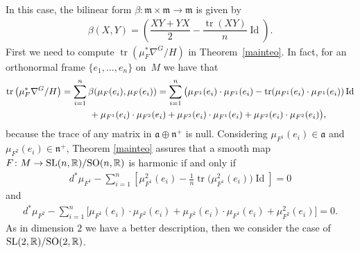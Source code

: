 \documentclass[pdftex]{sigma}
\numberwithin{equation}{section}
\newcommand{\m}{\mathfrak{m}}
\begin{document}
In this case, the bilinear form $\beta\colon \m \times \m \rightarrow \m$ is given by
\begin{gather}\label{fisherconnection}
  \beta(X,Y) = \left(\dfrac{XY+YX}{2} - \dfrac{\operatorname{tr}(XY)}{n}\operatorname{Id}\right).
\end{gather}
First we need to compute  $\operatorname{tr}(\mu_F^*\nabla^G/H)$ in Theorem~\ref{mainteo}. In fact, for an orthonormal frame $\{e_1,\ldots, e_n\}$ on~$M$  we have that
\begin{gather*}
  \operatorname{tr}\big(\mu_F^*\nabla^G/H\big)
    =   \sum_{i=1}^{n}\beta(\mu_F(e_i),\mu_F(e_i))
    =   \sum_{i=1}^{n}\big(\mu_{F^1}(e_i)\cdot \mu_{F^1}(e_i)  - {\rm tr}(\mu_{F^1}(e_i)\cdot \mu_{F^1}(e_i))\operatorname{Id}\\
  \hphantom{\operatorname{tr}\big(\mu_F^*\nabla^G/H\big)}{}
    +   \mu_{F^1}(e_i)\cdot\mu_{F^2}(e_i)+ \mu_{F^2}(e_i)\cdot\mu_{F^1}(e_i)+ \mu_{F^2}(e_i)\cdot\mu_{F^2}(e_i)\big),
\end{gather*}
because the trace of any matrix in $\mathfrak{a}\oplus
\mathfrak{n}^{+}$ is null. Considering $\mu_{F^1}(e_i) \in
\mathfrak{a}$ and $ \mu_{F^2}(e_i) \in \mathfrak{n}^{+}$, Theorem
\ref{mainteo} assures that a smooth map $F\colon M \rightarrow {\rm
SL}(n,{\mathbb R})/{\rm SO}(n,{\mathbb R})$ is harmonic if and only if
\begin{gather}
  d^*\mu_{F^1} - \sum_{i=1}^{n} \left[\mu_{F^1}^2(e_i) -\frac{1}{n}\operatorname{tr}\big(\mu_{F^1}^2(e_i)\big)\operatorname{Id}\right]   =   0 \label{equation1}
\end{gather}
and
\begin{gather}
  d^*\mu_{F^2} - \sum_{i=1}^{n} \big[\mu_{F^1}(e_i)\cdot\mu_{F^2}(e_i)+ \mu_{F^2}(e_i)\cdot\mu_{F^1}(e_i)+ \mu_{F^2}^2(e_i)\big]  =  0. \label{equation2}
\end{gather}
As in dimension $2$ we have a better description, then we consider
the case of ${\rm SL}(2,{\mathbb R})/{\rm SO}(2,{\mathbb R})$.
\end{document}
